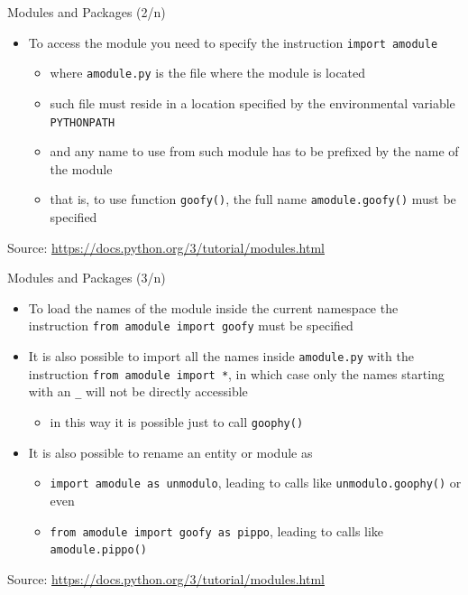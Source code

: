 \documentclass{beamer}
\begin{document}
\begin{frame}[fragile]
{\centerline{Modules and Packages (2/n)}}
\begin{itemize}
        \item To access the module you need to specify the instruction \texttt{import amodule} 
               \begin{itemize}
		\item where \texttt{amodule.py} is the file where the module is located
		\item such file must reside in a location specified by the environmental variable \texttt{PYTHONPATH}
		\item and any name to use from such module has to be prefixed by the name of the module
		\item that is, to use function \texttt{goofy()}, the full name \texttt{amodule.goofy()} must be specified
	     \end{itemize}	 
    \end{itemize}
    \begin{center}
	\tiny Source: \url{https://docs.python.org/3/tutorial/modules.html}
    \end{center}
\end{frame}

\begin{frame}[fragile]
{\centerline{Modules and Packages (3/n)}}
\begin{itemize}
	 \item To load the names of the module inside the current namespace the instruction \texttt{from amodule import goofy} must be specified
	 \item It is also possible to import all the names inside \texttt{amodule.py} with the instruction \texttt{from amodule import *}, in which case only the names starting with an \texttt{\_} will not be directly accessible
               \begin{itemize}
		\item in this way it is possible just to call \texttt{goophy()}
              \end{itemize}
	 \item It is also possible to rename an entity or module as 
	       \begin{itemize}
		  \item \texttt{import amodule as unmodulo}, leading to calls like \texttt{unmodulo.goophy()} or even
		  \item  \texttt{from amodule import goofy as pippo}, leading to calls like \texttt{amodule.pippo()}
              \end{itemize}
    \end{itemize}
    \begin{center}
	\tiny Source: \url{https://docs.python.org/3/tutorial/modules.html}
    \end{center}
\end{frame}
\end{document}
